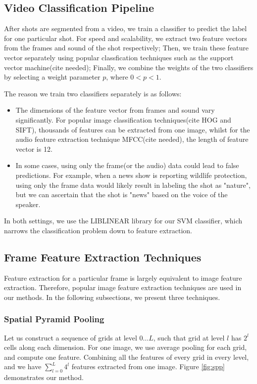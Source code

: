 \documentclass{article}
\begin{document}
\subsection{Video Classification Pipeline}
After shots are segmented from a video, we train a classifier to predict the label for one particular shot. For speed and scalability, we extract two feature vectors from the frames and sound of the shot respectively; Then, we train these feature vector separately using popular classfication techniques such as the support vector machine(cite needed); Finally, we combine the weights of the two classifiers by selecting a weight parameter $p$, where $0 < p < 1$. \par
The reason we train two classifiers separately is as follows:
\begin{itemize}
\item The dimensions of the feature vector from frames and sound vary significantly. For popular image classification techniques(cite HOG and SIFT), thousands of features can be extracted from one image, whilst for the audio feature extraction technique MFCC(cite needed), the length of feature vector is 12.
\item In some cases, using only the frame(or the audio) data could lead to false predictions. For example, when a news show is reporting wildlife protection, using only the frame data would likely result in labeling the shot as "nature", but we can ascertain that the shot is "news" based on the voice of the speaker.
\end{itemize}
In both settings, we use the LIBLINEAR library for our SVM classifier, which narrows the classification problem down to feature extraction.
\subsection{Frame Feature Extraction Techniques}
Feature extraction for a particular frame is largely equivalent to image feature extraction. Therefore, popular image feature extraction techniques are used in our methods. In the following subsections, we present three techniques.
\subsubsection{Spatial Pyramid Pooling\cite{he2014spatial}}
Let us construct a sequence of grids at level $0 \ldots L$, such that grid at level $l$ has $2^l$ cells along each dimension. For one image, we use average pooling for each grid, and compute one feature. Combining all the features of every grid in every level, and we have $\sum_{l=0}^{L} 4^l$ features extracted from one image. Figure \ref{fig:spp} demonstrates our method.
\end{document}
